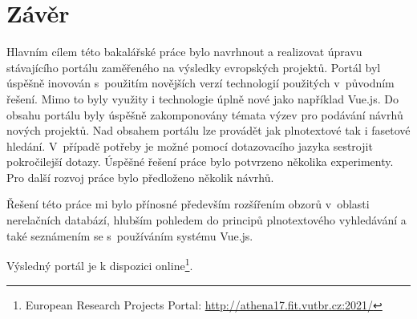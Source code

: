 \chapter{Závěr}
Hlavním cílem této bakalářské práce bylo navrhnout a realizovat úpravu stávajícího portálu zaměřeného na výsledky evropských projektů. Portál byl úspěšně inovován s~použitím novějších verzí technologií použitých v~původním řešení. Mimo to byly využity i technologie úplně nové jako například Vue.js. Do obsahu portálu byly úspěšně zakomponovány témata výzev pro podávání návrhů nových projektů. Nad obsahem portálu lze provádět jak plnotextové tak i fasetové hledání. V~případě potřeby je možné pomocí dotazovacího jazyka sestrojit pokročilejší dotazy. Úspěšné řešení práce bylo potvrzeno několika experimenty. Pro další rozvoj práce bylo předloženo několik návrhů.

Řešení této práce mi bylo přínosné především rozšířením obzorů v~oblasti nerelačních databází, hlubším pohledem do principů plnotextového vyhledávání a také seznámením se s~používáním systému Vue.js.

Výsledný portál je k dispozici online\footnote{European Research Projects Portal: \url{http://athena17.fit.vutbr.cz:2021/}}.